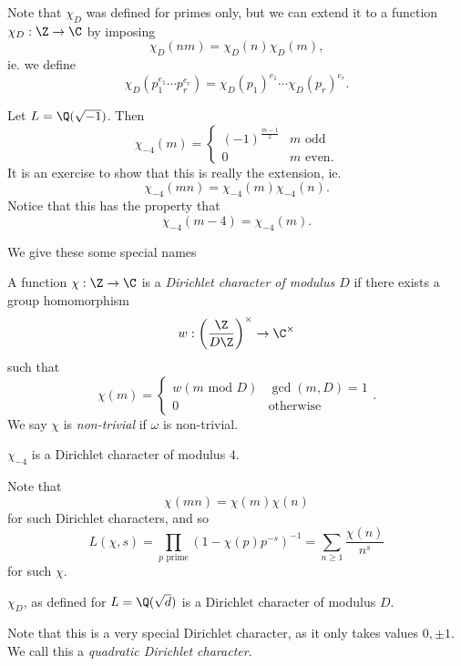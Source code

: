 \documentclass[a4paper]{article}
\begin{document}
Note that $\chi_D$ was defined for primes only, but we can extend it to a function $\chi_D: \Z \to \C$ by imposing
\[
  \chi_D(nm) = \chi_D(n)\chi_D(m),
\]
ie. we define
\[
  \chi_D(p_1^{e_1} \cdots p_r^{e_r}) = \chi_D(p_1)^{e_1} \cdots \chi_D(p_r)^{e_r}.
\]
\begin{eg}
  Let $L = \Q(\sqrt{-1})$. Then
  \[
    \chi_{-4}(m) =
    \begin{cases}
      (-1)^{\frac{m - 1}{2}} & m\text{ odd}\\
      0 & m\text{ even}.
    \end{cases}
  \]
  It is an exercise to show that this is really the extension, ie.
  \[
    \chi_{-4}(mn) = \chi_{-4}(m) \chi_{-4}(n).
  \]
  Notice that this has the property that
  \[
    \chi_{-4}(m - 4) = \chi_{-4}(m).
  \]
\end{eg}
We give these some special names
\begin{defi}
  A function $\chi: \Z \to \C$ is a \emph{Dirichlet character of modulus $D$} if there exists a group homomorphism
  \[
    w: \left(\frac{\Z}{D\Z}\right)^\times \to \C^\times
  \]
  such that
  \[
    \chi(m) =
    \begin{cases}
      w(m\text{ mod } D) & \gcd(m, D) = 1\\
      0 & \text{otherwise}
    \end{cases}.
  \]
  We say $\chi$ is \emph{non-trivial} if $\omega$ is non-trivial.
\end{defi}

\begin{eg}
  $\chi_{-4}$ is a Dirichlet character of modulus $4$.
\end{eg}

Note that
\[
  \chi(mn) = \chi(m)\chi(n)
\]
for such Dirichlet characters, and so
\[
  L(\chi, s) = \prod_{p\text{ prime}} (1 - \chi(p)p^{-s})^{-1} = \sum_{n \geq 1} \frac{\chi(n)}{n^s}
\]
for such $\chi$.

\begin{prop}
  $\chi_D$, as defined for $L = \Q(\sqrt{d})$ is a Dirichlet character of modulus $D$.
\end{prop}
Note that this is a very special Dirichlet character, as it only takes values $0, \pm 1$. We call this a \emph{quadratic Dirichlet character}.
\end{document}
